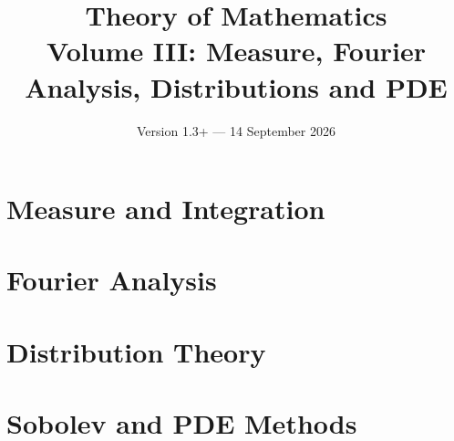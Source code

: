 \documentclass[11pt,a4paper,oneside,openany]{book}
\title{Theory of Mathematics\\[0.5em]\Large Volume III: Measure, Fourier Analysis, Distributions and PDE}
\author{}
\date{Version 1.3+ --- 14 September 2026}
\begin{document}
\maketitle
\clearpage
\frontmatter
\tableofcontents


\mainmatter

\part{Measure and Integration}









\part{Fourier Analysis}








\part{Distribution Theory}






\part{Sobolev and PDE Methods}











\backmatter

\end{document}
